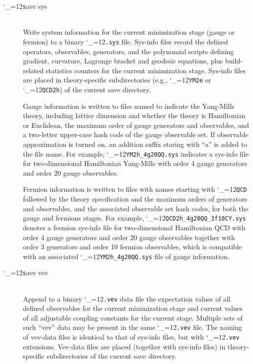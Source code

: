 \documentclass [12pt]{article}
\makeatletter
\renewcommand{\tt}{\begingroup\catcode`_=12\def\_{\string_}\tt@}
\newcommand{\tt@}[1]{\texttt{#1}\endgroup}
\makeatother
\begin{document}
\begin{description}
\item [\tt save sys]~\\
    Write system information for the current minimization stage
    (gauge or fermion) to a binary \tt{.sys} file.
    Sys-info files record the defined
    operators, observables, generators, and the polynomial scripts
    defining gradient, curvature, Lagrange bracket and geodesic equations,
    plus build-related statistics counters for the current minimization
    stage.
    Sys-info files are placed in theory-specific subdirectories
    (e.g., \tt{YM2e} or \tt{QCD2h})
    of the current save directory.

    Gauge information is written to files 
    named to indicate the Yang-Mills theory, including lattice dimension and whether
    the theory is Hamiltonian or Euclidean,
    the maximum order of gauge generators and observables, and
    a two-letter upper-case hash code of the gauge observable set.
    If observable approximation is turned on, an addition suffix
    staring with ``a'' is added to the file name.
    For example, \tt{YM2h_4g20QQ.sys} indicates a sys-info file for
    two-dimensional Hamiltonian Yang-Mills with order 4 gauge
    generators and order 20 gauge observables.

    Fermion information is written to files with names
    starting with \tt{QCD} followed by the theory specification and
    the maximum orders of generators and observables,
    and the associated observable set hash codes,
    for both the gauge and fermions stages.
    For example, \tt{QCD2h_4g20QQ_3f10CY.sys} denotes a fermion 
    sys-info file for two-dimensional Hamiltonian QCD with order 4 gauge
    generators and order 20 gauge observables together with
    order 3 generators and order 10 fermion observables,
    which is compatible with an associated \tt{YM2h_4g20QQ.sys}
    file of gauge information.

\item [\tt save vev]~\\
    Append to a binary \tt{.vev} data file the expectation
    values of all defined observables for the current minimization stage
    and current values of all adjustable coupling constants for the current stage.
    Multiple sets of such ``vev'' data may be present
    in the same \tt{.vev} file.
    The naming of vev-data files is identical to that of
    sys-info files, but with \tt{.vev} extensions.
    Vev-data files are placed (together with sys-info files)
    in theory-specific subdirectories of the current save directory.


\end{description}
\end{document}
